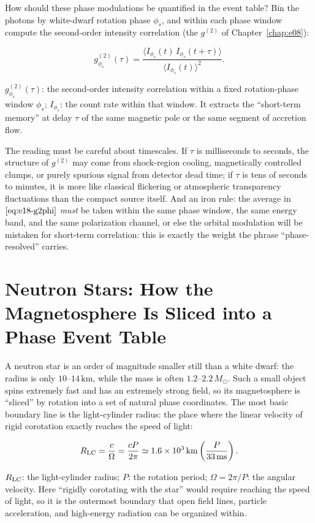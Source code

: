 How should these phase modulations be quantified in the event table? Bin the photons by white-dwarf rotation phase \(\phi_s\), and within each phase window compute the second-order intensity correlation (the \(g^{(2)}\) of Chapter~\ref{chap:e08}):

\begin{equation}
  g^{(2)}_{\phi_s}(\tau)=
  \frac{\langle I_{\phi_s}(t)\,I_{\phi_s}(t+\tau)\rangle}
       {\langle I_{\phi_s}(t)\rangle^2}.
  \label{eq:e18-g2phi}
\end{equation}
\begin{formulaexplain}
\(g^{(2)}_{\phi_s}(\tau)\): the second-order intensity correlation within a fixed rotation-phase window \(\phi_s\); \(I_{\phi_s}\): the count rate within that window. It extracts the ``short-term memory'' at delay \(\tau\) of the same magnetic pole or the same segment of accretion flow.
\end{formulaexplain}

The reading must be careful about timescales. If \(\tau\) is milliseconds to seconds, the structure of \(g^{(2)}\) may come from shock-region cooling, magnetically controlled clumps, or purely spurious signal from detector dead time; if \(\tau\) is tens of seconds to minutes, it is more like classical flickering or atmospheric transparency fluctuations than the compact source itself. And an iron rule: the average in \(\eqref{eq:e18-g2phi}\) \emph{must} be taken within the same phase window, the same energy band, and the same polarization channel, or else the orbital modulation will be mistaken for short-term correlation: this is exactly the weight the phrase ``phase-resolved'' carries.


\section{Neutron Stars: How the Magnetosphere Is Sliced into a Phase Event Table}
\label{sec:e18-nsphase}

A neutron star is an order of magnitude smaller still than a white dwarf: the radius is only \(10\)--\(14\,\mathrm{km}\), while the mass is often \(1.2\)--\(2.2\,M_\odot\). Such a small object spins extremely fast and has an extremely strong field, so its magnetosphere is ``sliced'' by rotation into a set of natural phase coordinates. The most basic boundary line is the light-cylinder radius: the place where the linear velocity of rigid corotation exactly reaches the speed of light:

\begin{equation}
  R_{\rm LC}=\frac{c}{\Omega}=\frac{cP}{2\pi}
  \simeq 1.6\times10^3\,\mathrm{km}
  \left(\frac{P}{33\,\mathrm{ms}}\right).
  \label{eq:e18-rlc}
\end{equation}
\begin{formulaexplain}
\(R_{\rm LC}\): the light-cylinder radius; \(P\): the rotation period; \(\Omega=2\pi/P\): the angular velocity. Here ``rigidly corotating with the star'' would require reaching the speed of light, so it is the outermost boundary that open field lines, particle acceleration, and high-energy radiation can be organized within.
\end{formulaexplain}

